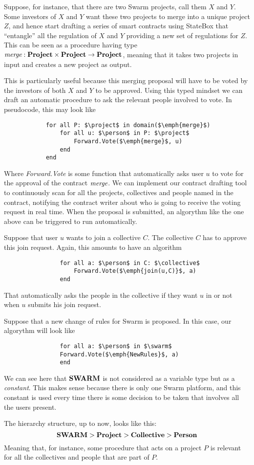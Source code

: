 \documentclass[submission, copyright,creativecommons,sharealike,noncommercial]{eptcs}
\begin{document}
	\begin{example}
		Suppose, for instance, that there are two Swarm projects, call them $X$ and $Y$. Some investors of $X$ and $Y$ want these two projects to merge into a unique project $Z$, and hence start drafting a series of smart contracts using StateBox that ``entangle'' all the regulation of $X$ and $Y$ providing a new set of regulations for $Z$. This can be seen as a procedure having type $\emph{merge}: \textbf{Project} \times \textbf{Project} \to \textbf{Project}$, meaning that it takes two projects in input and creates a new project as output. 
		
		This is particularly useful because this merging proposal will have to be voted by the investors of both $X$ and $Y$ to be approved. Using this typed mindset we can draft an automatic procedure to ask the relevant people involved to vote. In pseudocode, this may look like
			\begin{lstlisting}
			for all P: $\project$ in domain($\emph{merge}$)
				for all u: $\person$ in P: $\project$
					Forward.Vote($\emph{merge}$, u)
				end
			end
			\end{lstlisting}
		Where \emph{Forward.Vote} is some function that automatically asks user $u$ to vote for the approval of the contract $\emph{merge}$. We can implement our contract drafting tool to continuously scan for all the projects, collectives and people named in the contract, notifying the contract writer about who is going to receive the voting request in real time. When the proposal is submitted, an algorythm like the one above can be triggered to run automatically.
	\end{example}
	\begin{example}
		Suppose that user $u$ wants to join a collective $C$. The collective $C$ has to approve this join request. Again, this amounts to have an algorithm
			\begin{lstlisting}
				for all a: $\person$ in C: $\collective$
					Forward.Vote($\emph{join(u,C)}$, a)
				end
			\end{lstlisting}
		That automatically asks the people in the collective if they want $u$ in or not when $u$ submits his join request.
	\end{example}
	\begin{example}
		Suppose that a new change of rules for Swarm is proposed. In this case, our algorythm will look like
			\begin{lstlisting}
				for all a: $\person$ in $\swarm$
				Forward.Vote($\emph{NewRules}$, a)
				end
			\end{lstlisting}
		We can see here that $\textbf{SWARM}$ is not considered as a variable type but as a \emph{constant}. This makes sense because there is only one Swarm platform, and this constant is used every time there is some decision to be taken that involves all the users present.
	\end{example}
	\noindent
	The hierarchy structure, up to now, looks like this:
	\[
	\textbf{SWARM} > \textbf{Project} > \textbf{Collective} > \textbf{Person}
	\]
	Meaning that, for instance, some procedure that acts on a project $P$ is relevant for all the collectives and people that are part of $P$. 
\end{document}
